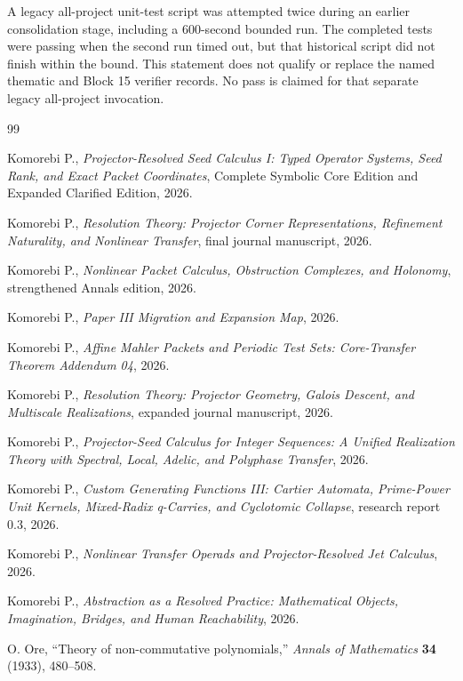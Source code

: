 \documentclass[11pt]{article}
\theoremstyle{definition}
\theoremstyle{remark}
\begin{document}


A legacy all-project unit-test script was attempted twice during an earlier consolidation stage, including a 600-second bounded run. The completed tests were passing when the second run timed out, but that historical script did not finish within the bound. This statement does not qualify or replace the named thematic and Block 15 verifier records. No pass is claimed for that separate legacy all-project invocation.

\clearpage
\begin{thebibliography}{99}

Komorebi P., \emph{Projector-Resolved Seed Calculus I: Typed Operator Systems, Seed Rank, and Exact Packet Coordinates}, Complete Symbolic Core Edition and Expanded Clarified Edition, 2026.

Komorebi P., \emph{Resolution Theory: Projector Corner Representations, Refinement Naturality, and Nonlinear Transfer}, final journal manuscript, 2026.

Komorebi P., \emph{Nonlinear Packet Calculus, Obstruction Complexes, and Holonomy}, strengthened Annals edition, 2026.

Komorebi P., \emph{Paper III Migration and Expansion Map}, 2026.

Komorebi P., \emph{Affine Mahler Packets and Periodic Test Sets: Core-Transfer Theorem Addendum 04}, 2026.

Komorebi P., \emph{Resolution Theory: Projector Geometry, Galois Descent, and Multiscale Realizations}, expanded journal manuscript, 2026.

Komorebi P., \emph{Projector-Seed Calculus for Integer Sequences: A Unified Realization Theory with Spectral, Local, Adelic, and Polyphase Transfer}, 2026.

Komorebi P., \emph{Custom Generating Functions III: Cartier Automata, Prime-Power Unit Kernels, Mixed-Radix q-Carries, and Cyclotomic Collapse}, research report 0.3, 2026.

Komorebi P., \emph{Nonlinear Transfer Operads and Projector-Resolved Jet Calculus}, 2026.

Komorebi P., \emph{Abstraction as a Resolved Practice: Mathematical Objects, Imagination, Bridges, and Human Reachability}, 2026.

O. Ore, ``Theory of non-commutative polynomials,'' \emph{Annals of Mathematics} \textbf{34} (1933), 480--508.


\end{thebibliography}
\end{document}
